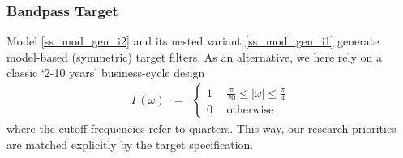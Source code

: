 \documentclass[a4paper]{book}
\begin{document}
\subsubsection{Bandpass Target}


Model \ref{ss_mod_gen_i2} and its nested variant \ref{ss_mod_gen_i1} generate model-based (symmetric) target filters. As an alternative, we here rely on a classic `2-10 years' business-cycle design
\begin{eqnarray}\label{ideal_bp_t}
\Gamma(\omega)&=&\left\{\begin{array}{cc}1~&~\frac{\pi}{20}\leq |\omega|\leq \frac{\pi}{4}\\
0~&~\textrm{otherwise}\end{array}\right.
\end{eqnarray}
where the cutoff-frequencies refer to quarters. This way, our research priorities are matched explicitly by the target specification. \\
\end{document}
